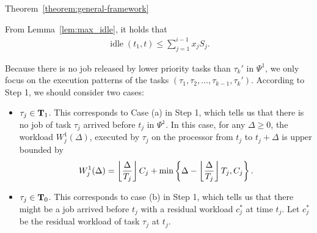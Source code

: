 \begin{appProof}{Theorem~\ref{theorem:general-framework}}

From Lemma~\ref{lem:max_idle}, it holds that
\begin{align}
\label{eq:sumof-sigma}
\operatorname{idle}(t_1, t) \leq \sum_{j=1}^{i-1} x_j S_j.
\end{align}


Because there is no job released by lower priority tasks than
$\tau_k'$ in $\Psi^1$, we only focus on the execution patterns of the
tasks $(\tau_1, \tau_2, \ldots, \tau_{k-1}, \tau_k')$. According to
Step 1, we should consider two cases:
\begin{itemize}
\item $\tau_j \in {\bf T}_1$. This corresponds to Case
  (a) in Step 1, which tells us that there is no job of task $\tau_j$ arrived
  before $t_j$ in $\Psi^1$.   In this case, for any $\Delta \geq 0$, the workload $W_j^1(\Delta)$, executed by
  $\tau_j$ on the processor from $t_j$ to $t_j+\Delta$ is upper bounded by
\begin{equation}
  \label{eq:execution-case1}
  W_j^1(\Delta) = \floor{\frac{\Delta}{T_j}}C_j + \min\left\{\Delta-\floor{\frac{\Delta}{T_j}}T_j, C_j\right\}.
\end{equation}
\item $\tau_j \in {\bf T}_0$. This
  corresponds to case (b) in Step 1, which tells us that there might be a job arrived
  before $t_j$ with a residual workload $c_j^*$ at time $t_j$. %
  Let $c_j^*$ be the residual workload of task $\tau_j$ at $t_j$. 

\end{itemize}
\end{appProof}

